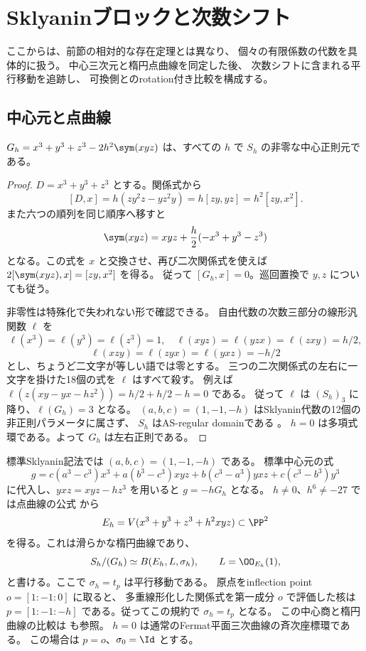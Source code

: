 \section{Sklyaninブロックと次数シフト}\label{sec:elliptic}

ここからは、前節の相対的な存在定理とは異なり、
個々の有限係数の代数を具体的に扱う。
中心三次元と楕円点曲線を同定した後、
次数シフトに含まれる平行移動を追跡し、
可換側とのrotation付き比較を構成する。

\subsection{中心元と点曲線}

\begin{lemma}\label{lem:center}
 \(G_h=x^3+y^3+z^3-2h^2\sym(xyz)\) は、すべての \(h\) で
 \(S_h\) の非零な中心正則元である。
\end{lemma}
\begin{proof}
 \(D=x^3+y^3+z^3\) とする。関係式から
 \[
 [D,x]=h(zy^2z-yz^2y)=h[zy,yz]=h^2[zy,x^2].
 \]
 また六つの順列を同じ順序へ移すと
 \[
 \sym(xyz)=xyz+\frac h2(-x^3+y^3-z^3)
 \]
 となる。この式を \(x\) と交換させ、再び二次関係式を使えば
 \(2[\sym(xyz),x]=[zy,x^2]\) を得る。
 従って \([G_h,x]=0\)。巡回置換で \(y,z\) についても従う。

 非零性は特殊化で失われない形で確認できる。
 自由代数の次数三部分の線形汎関数 \(\ell\) を
 \[
 \ell(x^3)=\ell(y^3)=\ell(z^3)=1,\quad
 \ell(xyz)=\ell(yzx)=\ell(zxy)=h/2,
 \]
 \[
 \ell(xzy)=\ell(zyx)=\ell(yxz)=-h/2
 \]
 とし、ちょうど二文字が等しい語では零とする。
 三つの二次関係式の左右に一文字を掛けた18個の式を \(\ell\) はすべて殺す。
 例えば \(\ell(z(xy-yx-hz^2))=h/2+h/2-h=0\) である。
 従って \(\ell\) は \((S_h)_3\) に降り、\(\ell(G_h)=3\) となる。
 \((a,b,c)=(1,-1,-h)\) はSklyanin代数の12個の非正則パラメータに属さず、
 \(S_h\) はAS-regular domainである \cite[Introduction]{CGWZ}。
 \(h=0\) は多項式環である。よって \(G_h\) は左右正則である。
\end{proof}

標準Sklyanin記法では \((a,b,c)=(1,-1,-h)\) である。
標準中心元の式 \cite[Equation (2.16)]{Walton}
\[
 g=c(a^3-c^3)x^3+a(b^3-c^3)xyz+b(c^3-a^3)yxz+c(c^3-b^3)y^3
\]
に代入し、\(yxz=xyz-hz^3\) を用いると \(g=-hG_h\) となる。
\(h\ne0\)、\(h^6\ne-27\) では点曲線の公式
\cite[Theorem 2.14]{Walton}から
\[
 E_h=V(x^3+y^3+z^3+h^2xyz)\subset\PP^2
\]
を得る。これは滑らかな楕円曲線であり、
\[
 S_h/(G_h)\simeq B(E_h,L,\sigma_h),\qquad L=\OO_{E_h}(1),
\]
と書ける。ここで \(\sigma_h=t_p\) は平行移動である。
原点をinflection point \(o=[1:-1:0]\) に取ると、
多重線形化した関係式を第一成分 \(o\) で評価した核は
\(p=[1:-1:-h]\) である。従ってこの規約で \(\sigma_h=t_p\) となる。
この中心商と楕円曲線の比較は \cite[Sections 3.5--3.6]{EG} も参照。
\(h=0\) は通常のFermat平面三次曲線の斉次座標環である。
この場合は \(p=o\)、\(\sigma_0=\Id\) とする。

